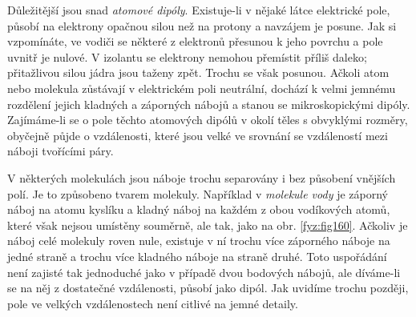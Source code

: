   Důležitější jsou snad \emph{atomové dipóly}. Existuje-li v nějaké látce elektrické pole, působí na
  elektrony opačnou silou než na protony a navzájem je posune. Jak si vzpomínáte, ve vodiči se
  některé z elektronů přesunou k jeho povrchu a pole uvnitř je nulové. V izolantu se elektrony
  nemohou přemístit příliš daleko; přitažlivou silou jádra jsou taženy zpět. Trochu se však posunou.
  Ačkoli atom nebo molekula zůstávají v elektrickém poli neutrální, dochází k velmi jemnému
  rozdělení jejich kladných a záporných nábojů a stanou se mikroskopickými dipóly. Zajímáme-li se o
  pole těchto atomových dipólů v okolí těles s obvyklými rozměry, obyčejně půjde o vzdálenosti,
  které jsou velké ve srovnání se vzdáleností mezi náboji tvořícími páry.
  
  V některých molekulách jsou náboje trochu separovány i bez působení vnějších polí. Je to způsobeno
  tvarem molekuly. Například v \emph{molekule vody} je záporný náboj na atomu kyslíku a kladný náboj
  na každém z obou vodíkových atomů, které však nejsou umístěny souměrně, ale tak, jako na obr.
  \ref{fyz:fig160}. Ačkoliv je náboj celé molekuly roven nule, existuje v ní trochu více záporného
  náboje na jedné straně a trochu více kladného náboje na straně druhé. Toto uspořádání není zajisté
  tak jednoduché jako v případě dvou bodových nábojů, ale díváme-li se na něj z dostatečné
  vzdálenosti, působí jako dipól. Jak uvidíme trochu později, pole ve velkých vzdálenostech není
  citlivé na jemné detaily.


